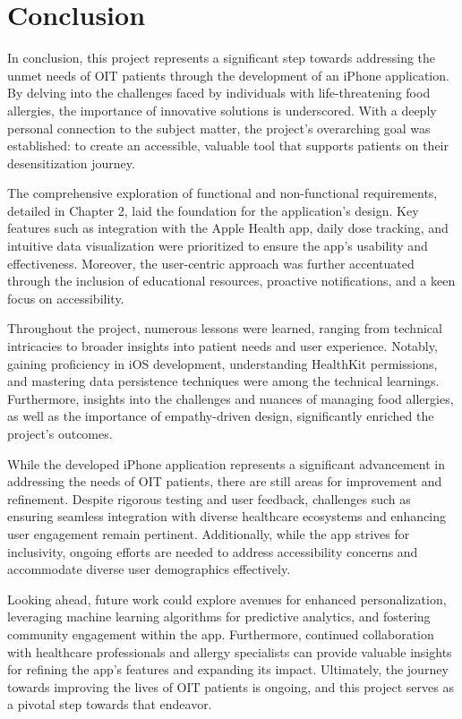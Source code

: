 \chapter{Conclusion}

In conclusion, this project represents a significant step towards addressing the unmet needs of OIT patients through the development of an iPhone application. By delving into the challenges faced by individuals with life-threatening food allergies, the importance of innovative solutions is underscored. With a deeply personal connection to the subject matter, the project's overarching goal was established: to create an accessible, valuable tool that supports patients on their desensitization journey.

The comprehensive exploration of functional and non-functional requirements, detailed in Chapter 2, laid the foundation for the application's design. Key features such as integration with the Apple Health app, daily dose tracking, and intuitive data visualization were prioritized to ensure the app's usability and effectiveness. Moreover, the user-centric approach was further accentuated through the inclusion of educational resources, proactive notifications, and a keen focus on accessibility.

Throughout the project, numerous lessons were learned, ranging from technical intricacies to broader insights into patient needs and user experience. Notably, gaining proficiency in iOS development, understanding HealthKit permissions, and mastering data persistence techniques were among the technical learnings. Furthermore, insights into the challenges and nuances of managing food allergies, as well as the importance of empathy-driven design, significantly enriched the project's outcomes.

While the developed iPhone application represents a significant advancement in addressing the needs of OIT patients, there are still areas for improvement and refinement. Despite rigorous testing and user feedback, challenges such as ensuring seamless integration with diverse healthcare ecosystems and enhancing user engagement remain pertinent. Additionally, while the app strives for inclusivity, ongoing efforts are needed to address accessibility concerns and accommodate diverse user demographics effectively.

Looking ahead, future work could explore avenues for enhanced personalization, leveraging machine learning algorithms for predictive analytics, and fostering community engagement within the app. Furthermore, continued collaboration with healthcare professionals and allergy specialists can provide valuable insights for refining the app's features and expanding its impact. Ultimately, the journey towards improving the lives of OIT patients is ongoing, and this project serves as a pivotal step towards that endeavor.
